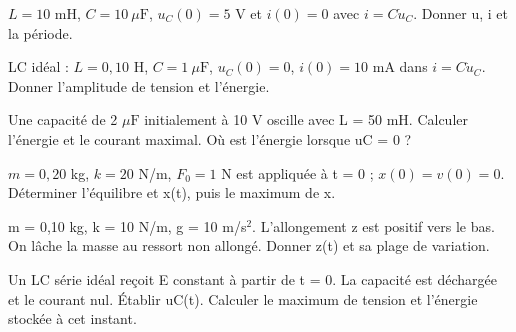 \begin{questions}
\item $L=10$ mH, $C=10\ \mu\mathrm{ F}$, $u_C(0)=5$ V et $i(0)=0$ avec $i=C\dot u_C$. Donner u, i et la période.
\end{questions}

\begin{questions}
\item LC idéal : $L=0{,}10$ H, $C=1\ \mu\mathrm{ F}$, $u_C(0)=0$, $i(0)=10$ mA dans $i=C\dot u_C$. Donner l’amplitude de tension et l’énergie.
\end{questions}

\begin{questions}
\item Une capacité de 2 $\mu\mathrm{ F}$ initialement à 10 V oscille avec L = 50 mH. Calculer l’énergie et le courant maximal. Où est l’énergie lorsque uC = 0 ?
\end{questions}



\begin{questions}
\item $m=0{,}20$ kg, $k=20$ N/m, $F_0=1$ N est appliquée à t = 0 ; $x(0)=v(0)=0$. Déterminer l’équilibre et x(t), puis le maximum de x.
\end{questions}

\begin{questions}
\item m = 0,10 kg, k = 10 N/m, g = 10 m/s$^2$. L’allongement z est positif vers le bas. On lâche la masse au ressort non allongé. Donner z(t) et sa plage de variation.
\end{questions}

\begin{questions}
\item Un LC série idéal reçoit E constant à partir de t = 0. La capacité est déchargée et le courant nul. Établir uC(t). Calculer le maximum de tension et l’énergie stockée à cet instant.
\end{questions}



